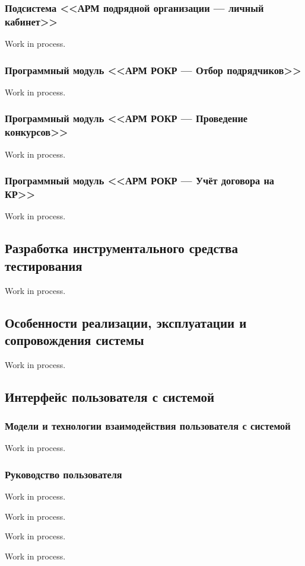 \subsubsection{Подсистема <<АРМ подрядной организации --- личный кабинет>>}

Work in process.

\subsubsection{Программный модуль <<АРМ РОКР --- Отбор подрядчиков>>}

Work in process.

\subsubsection{Программный модуль <<АРМ РОКР --- Проведение конкурсов>>}

Work in process.

\subsubsection{Программный модуль <<АРМ РОКР --- Учёт договора на КР>>}

Work in process.

\subsection{Разработка инструментального средства тестирования}

Work in process.

\subsection{Особенности реализации, эксплуатации и сопровождения системы}

Work in process.

\subsection{Интерфейс пользователя с системой}

\subsubsection{Модели и технологии взаимодействия пользователя с системой}

Work in process.

\subsubsection{Руководство пользователя}


Work in process.


Work in process.


Work in process.


Work in process.

\clearpage
\newpage